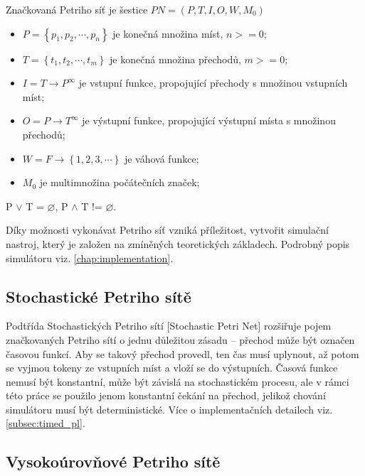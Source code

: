 Značkovaná Petriho síť je šestice $PN = \left(P, T, I, O, W, M_0\right)$
\begin{itemize}
  \item $P = \left\{p_1, p_2, \cdots , p_n\right\}$ je konečná množina míst, $n >= 0$; \\
  \item $T = \left\{t_1, t_2, \cdots , t_m\right\}$ je konečná množina přechodů, $m >= 0$; \\
  \item $I = T \rightarrow P^\infty$ je vstupní funkce, propojující přechody s množinou vstupních míst; \\
  \item $O = P \rightarrow T^\infty$ je výstupní funkce, propojující výstupní místa s množinou přechodů; \\
  \item $W = F \rightarrow \left\{1, 2, 3, \cdots \right\}$ je váhová funkce; \\
  \item $M_0$ je multimnožina počátečních značek;
\end{itemize}
P $\vee$ T = $\varnothing$, P $\wedge$ T != $\varnothing$.

Díky možnosti vykonávat Petriho síť vzniká příležitost, vytvořit simulační nastroj, který je založen na zmíněných teoretických základech. Podrobný popis simulátoru viz. \ref{chap:implementation}.

\subsection{Stochastické Petriho sítě}
\label{subsec:timed-pn}

Podtřída Stochastických Petriho sítí [Stochastic Petri Net] rozšiřuje pojem značkovaných Petriho sítí o jednu důležitou zásadu -- přechod může být označen časovou funkcí. Aby se takový přechod provedl, ten čas musí uplynout, až potom se vyjmou tokeny ze vstupních míst a vloží se do výstupních. Časová funkce nemusí být konstantní, může být závislá na stochastickém procesu, ale v rámci této práce se použilo jenom konstantní čekání na přechod, jelikož chování simulátoru musí být deterministické. Více o implementačních detailech viz. \ref{subsec:timed_pl}.

\subsection{Vysokoúrovňové Petriho sítě}
\label{subsec:hlpn}

